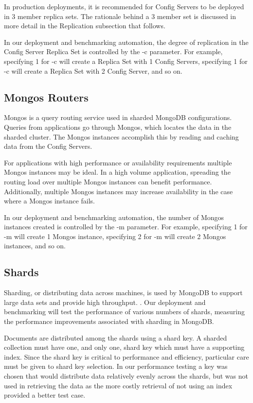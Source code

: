 \documentclass[9pt,twocolumn,twoside]{../../styles/osajnl}
\begin{document}
In production deployments, it is recommended for Config Servers to be deployed in 3 member replica sets. \cite{www-mongoComponents}  The rationale behind a 3 member set is discussed in more detail in the Replication subsection that follows.

In our deployment and benchmarking automation, the degree of replication in the Config Server Replica Set is controlled by the -c parameter.  For example, specifying 1 for -c will create a Replica Set with 1 Config Servers, specifying 1 for -c will create a Replica Set with 2 Config Server, and so on. 

\subsection{Mongos Routers}

Mongos is a query routing service used in sharded MongoDB configurations.  Queries from applications go through Mongos, which locates the data in the sharded cluster. The Mongos instances accomplish this by reading and caching data from the Config Servers. \cite{www-mongoMongos} 

For applications with high performance or availability requirements multiple Mongos instances may be ideal.  In a high volume application, spreading the routing load over multiple Mongos instances can benefit performance.  Additionally, multiple Mongos instances may increase availability in the case where a Mongos instance fails. \cite{www-mongoConfig}

In our deployment and benchmarking automation, the number of Mongos instances created is controlled by the -m parameter.  For example, specifying 1 for -m will create 1 Mongos instance, specifying 2 for -m will create 2 Mongos instances, and so on. 


\subsection{Shards}

Sharding, or distributing data across machines, is used by MongoDB to support large data sets and provide high throughput. \cite{www-sharding}.  Our deployment and benchmarking will test the performance of various numbers of shards, measuring the performance improvements associated with sharding in MongoDB.

Documents are distributed among the shards using a shard key.  A sharded collection must have one, and only one, shard key which must have a supporting index. \cite{www-sharding}  Since the shard key is critical to performance and efficiency, particular care must be given to shard key selection. \cite{www-shardkey} In our performance testing a key was chosen that would distribute data relatively evenly across the shards, but was not used in retrieving the data as the more costly retrieval of not using an index provided a better test case.
\end{document}
